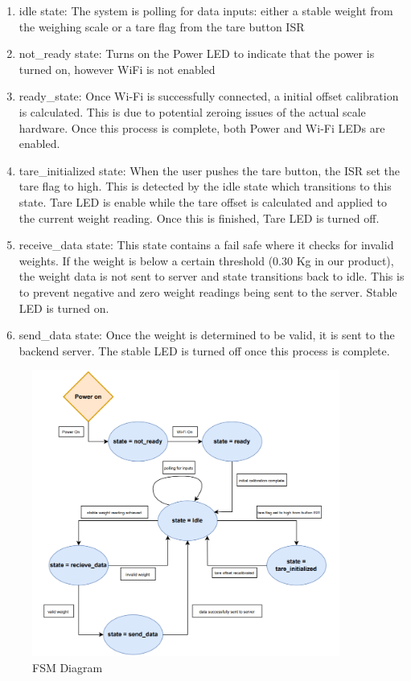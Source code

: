\begin{enumerate}
    \item idle state: The system is polling for data inputs: either a stable weight from the weighing scale or a tare flag from the tare button ISR
    \item not\_ready state: Turns on the Power LED to indicate that the power is turned on, however WiFi is not enabled 
    \item ready\_state: Once Wi-Fi is successfully connected, a initial offset calibration is calculated. This is due to potential zeroing issues of the actual scale hardware. Once this process is complete, both Power and Wi-Fi LEDs are enabled.
    \item tare\_initialized state: When the user pushes the tare button, the ISR set the tare flag to high. This is detected by the idle state which transitions to this state. Tare LED is enable while the tare offset is calculated and applied to the current weight reading. Once this is finished, Tare LED is turned off.
    \item receive\_data state: This state contains a fail safe where it checks for invalid weights. If the weight is below a certain threshold (0.30 Kg in our product), the weight data is not sent to server and state transitions back to idle. This is to prevent negative and zero weight readings being sent to the server. Stable LED is turned on.
    \item send\_data state: Once the weight is determined to be valid, it is sent to the backend server. The stable LED is turned off once this process is complete.
\end{enumerate}

\begin{figure}[h]
    \centering
    \includegraphics[width=0.9\textwidth]{final-report/assets/770_FSM.PNG}
    \caption{FSM Diagram}
    \label{fig:FSM_diagram}
\end{figure}

